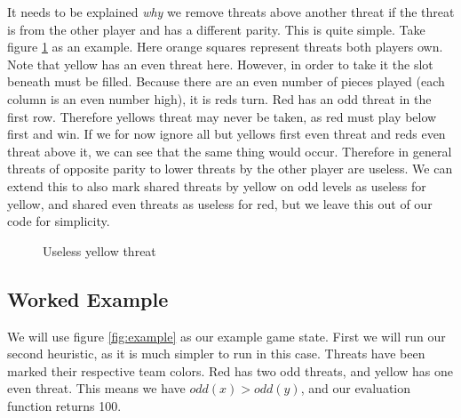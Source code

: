 \documentclass{article}
\newcommand{\rd}{\node [player, fill=red]{};}
\newcommand{\yw}{\node [player, fill=yellow] {};}
\newcommand{\gy}{\node [player, fill=white] {};}
\newcommand{\bt}{\node [threat, fill=orange!50] {};}
\begin{document}
It needs to be explained \emph{why} we remove threats above another threat if the threat is from the other player and has a different parity. This is quite simple. Take figure \ref{threatblock} as an example. Here orange squares represent threats both players own. Note that yellow has an even threat here. However, in order to take it the slot beneath must be filled. Because there are an even number of pieces played (each column is an even number high), it is reds turn. Red has an odd threat in the first row. Therefore yellows threat may never be taken, as red must play below first and win. If we for now ignore all but yellows first even threat and reds even threat above it, we can see that the same thing would occur. Therefore in general threats of opposite parity to lower threats by the other player are useless. We can extend this to also mark shared threats by yellow on odd levels as useless for yellow, and shared even threats as useless for red, but we leave this out of our code for simplicity.
		
\begin{figure}[t]
	\centering
	\caption{Useless yellow threat}
	\label{threatblock}
\end{figure}
\subsection{Worked Example}
We will use figure \ref{fig:example} as our example game state. First we will run our second heuristic, as it is much simpler to run in this case. Threats have been marked their respective team colors. Red has two odd threats, and yellow has one even threat. This means we have $odd(x) > odd(y)$, and our evaluation function returns 100.
	
\end{document}
